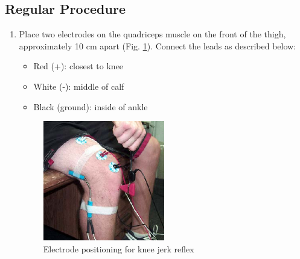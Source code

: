 \documentclass{article}
\begin{document}
\subsection*{Regular Procedure}
\begin{enumerate}
	\item Place two electrodes on the quadriceps muscle on the front of the thigh, approximately 10 cm apart (Fig. \ref{knee}). Connect the leads as described below:
		\begin{itemize}
			\item Red (+): closest to knee
			\item White (-): middle of calf
			\item Black (ground): inside of ankle
		\end{itemize}
		
		\begin{figure}[h]
		\centering
		\includegraphics[width=0.5\textwidth]{../images/EMG_II_7.jpg}	
		\caption{Electrode positioning for knee jerk reflex}
		\label{knee}
		\end{figure}
	

\end{enumerate}
\end{document}
